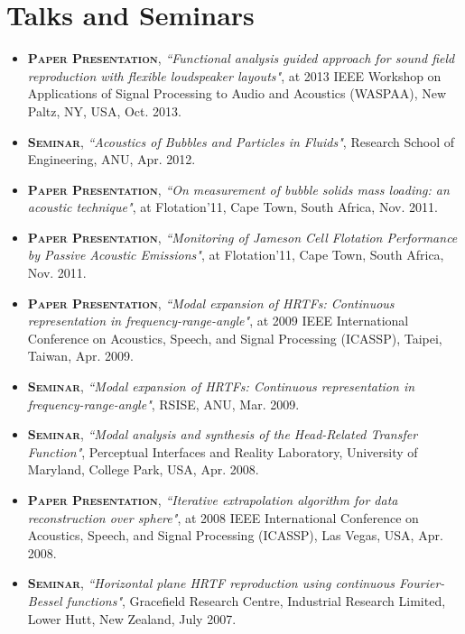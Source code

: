 \documentclass[10pt]{article}
\begin{document}
\section*{Talks and Seminars }
%
\begin{itemize}
%
\item \textsc{\textbf{Paper Presentation}},
\emph{``Functional analysis guided approach for sound field reproduction with flexible loudspeaker layouts"}, at 2013
IEEE Workshop on Applications of Signal Processing to Audio and Acoustics (WASPAA), New Paltz, NY, USA, Oct. 2013.

\item \textsc{\textbf{Seminar}},
\emph{``Acoustics of Bubbles and Particles in Fluids"}, Research School of Engineering, ANU, Apr. 2012.

%
\item \textsc{\textbf{Paper Presentation}},
\emph{``On measurement of bubble solids mass loading: an acoustic technique"}, at Flotation'11, Cape Town, South Africa, Nov. 2011.

\item \textsc{\textbf{Paper Presentation}},
\emph{``Monitoring of Jameson Cell Flotation Performance by Passive Acoustic Emissions"}, at Flotation'11, Cape Town, South Africa, Nov. 2011.

\item \textsc{\textbf{Paper Presentation}},
\emph{``Modal expansion of HRTFs: Continuous representation in frequency-range-angle"}, at 2009 IEEE
International Conference on Acoustics, Speech, and Signal Processing (ICASSP), Taipei, Taiwan, Apr. 2009.

\item \textsc{\textbf{Seminar}},
\emph{``Modal expansion of HRTFs: Continuous representation in frequency-range-angle"}, RSISE, ANU, Mar. 2009.

\item \textsc{\textbf{Seminar}},
\emph{``Modal analysis and synthesis of the Head-Related Transfer Function"}, Perceptual Interfaces and Reality
Laboratory, University of Maryland, College Park, USA, Apr. 2008.

\item \textsc{\textbf{Paper Presentation}},
\emph{``Iterative extrapolation algorithm for data reconstruction over sphere"}, at 2008 IEEE International
Conference on Acoustics, Speech, and Signal Processing (ICASSP), Las Vegas, USA, Apr. 2008.

\item \textsc{\textbf{Seminar}},
\emph{``Horizontal plane HRTF reproduction using continuous Fourier-Bessel functions"}, Gracefield Research
Centre, Industrial Research Limited, Lower Hutt, New Zealand, July 2007.


\end{itemize}
\end{document}
